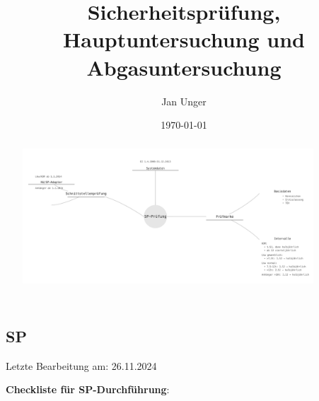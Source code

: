 \documentclass{vorlage-design-main}
\title{Sicherheitsprüfung, Hauptuntersuchung und Abgasuntersuchung}
\author{Jan Unger}
\date{\today}
\begin{document}
\maketitle

\begin{abstract}
\includegraphics[width=0.9\textwidth]{images/SP-Durchfuehrung-Mindmap.png}


\end{abstract}

\newpage

\subsection{SP}\label{sp}

Letzte Bearbeitung am: 26.11.2024

\textbf{Checkliste für SP-Durchführung}:
\end{document}

